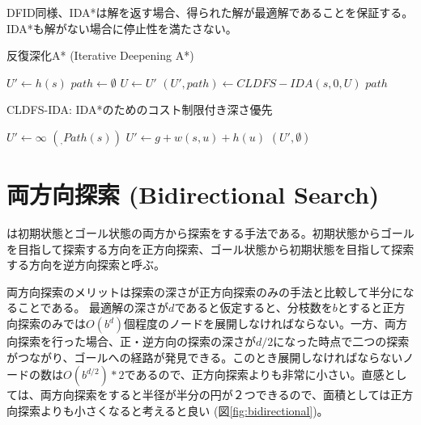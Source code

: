DFID同様、IDA*は解を返す場合、得られた解が最適解であることを保証する。
IDA*も解がない場合に停止性を満たさない。

\begin{algorithm}
\caption{反復深化A* (Iterative Deepening A*)}
\label{alg:ida}
        $U' \leftarrow h(s)$\;
        $path \leftarrow \emptyset$\;
         {
          $U \leftarrow U'$\;
          $(U', path) \leftarrow CLDFS-IDA(s, 0, U)$\;
        }
        \Return $path$\;
\end{algorithm}

\begin{algorithm}
\caption{CLDFS-IDA: IDA*のためのコスト制限付き深さ優先}
\label{alg:cldfs-ida}
        $U' \leftarrow \infty$\;
	 {
		\Return $(_, Path(s))$\;
	}
	 {
	   {
             {
              $U' \leftarrow g + w(s, u) + h(u)$\;
              }
            }
	}
	\Return $(U', \emptyset)$\;
\end{algorithm}



\section{両方向探索 (Bidirectional Search)}
\label{sec:bidirectional-search}

は初期状態とゴール状態の両方から探索をする手法である。初期状態からゴールを目指して探索する方向を正方向探索、ゴール状態から初期状態を目指して探索する方向を逆方向探索と呼ぶ。

両方向探索のメリットは探索の深さが正方向探索のみの手法と比較して半分になることである。
最適解の深さが$d$であると仮定すると、分枝数を$b$とすると正方向探索のみでは$O(b^d)$個程度のノードを展開しなければならない。一方、両方向探索を行った場合、正・逆方向の探索の深さが$d/2$になった時点で二つの探索がつながり、ゴールへの経路が発見できる。このとき展開しなければならないノードの数は$O(b^{d/2}) * 2$であるので、正方向探索よりも非常に小さい。直感としては、両方向探索をすると半径が半分の円が２つできるので、面積としては正方向探索よりも小さくなると考えると良い (図\ref{fig:bidirectional})。

